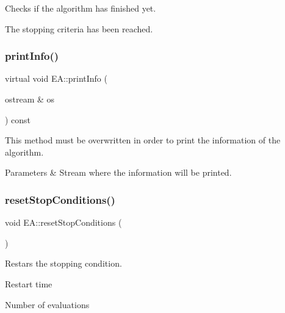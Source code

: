 Checks if the algorithm has finished yet. 

The stopping criteria has been reached. \mbox{\label{classEA_a2c495b6198538ee0ecbef9d18ced1f61}} 
\subsubsection{\texorpdfstring{print\+Info()}{printInfo()}}
{\footnotesize\ttfamily virtual void E\+A\+::print\+Info (\begin{DoxyParamCaption}\item[{ostream \&}]{os }\end{DoxyParamCaption}) const\hspace{0.3cm}{\ttfamily [pure virtual]}}



This method must be overwritten in order to print the information of the algorithm. 


\begin{DoxyParams}{Parameters}
{\em } & Stream where the information will be printed. \\
\hline
\end{DoxyParams}
\mbox{\label{classEA_ad56460c346eca5b890b27c85e985ec12}} 
\subsubsection{\texorpdfstring{reset\+Stop\+Conditions()}{resetStopConditions()}}
{\footnotesize\ttfamily void E\+A\+::reset\+Stop\+Conditions (\begin{DoxyParamCaption}{ }\end{DoxyParamCaption})}



Restars the stopping condition. 


\begin{DoxyItemize}
\item Restart time
\item Number of evaluations 
\end{DoxyItemize}\mbox{\label{classEA_afb4678f700cb03d64dc60fc3d24f7a1f}} 
